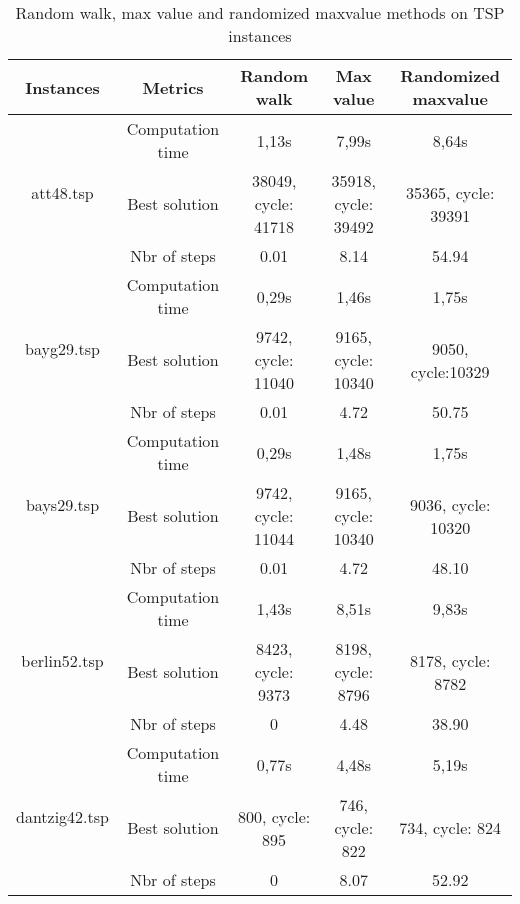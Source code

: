 
\begin{table}[htbp]
  \centering

	\renewcommand{\arraystretch}{1.5}
  \begin{tabular}{@{} |c|c|c|c|c| @{}}
	    \hline
    Instances & Metrics & Random walk & Max value & Randomized maxvalue \\ 
    \hline
    \multirow{3}{*}{att48.tsp} & Computation time & 1,13s & 7,99s & 8,64s \\ \cline{2-5}
    & Best solution & 38049, cycle: 41718 & 35918, cycle: 39492 & 35365, cycle: 39391 \\ \cline{2-5}
    & Nbr of steps & 0.01 & 8.14 & 54.94 \\ \cline{2-5}
    \hline
    \multirow{3}{*}{bayg29.tsp} & Computation time & 0,29s & 1,46s & 1,75s \\ \cline{2-5}
    & Best solution & 9742, cycle: 11040 & 9165, cycle: 10340 & 9050, cycle:10329 \\ \cline{2-5}
    & Nbr of steps & 0.01 & 4.72 & 50.75 \\ \cline{2-5}
    \hline
    \multirow{3}{*}{bays29.tsp} & Computation time & 0,29s & 1,48s & 1,75s \\ \cline{2-5}
    & Best solution & 9742, cycle: 11044 & 9165, cycle: 10340 & 9036, cycle: 10320 \\ \cline{2-5}
    & Nbr of steps & 0.01 & 4.72 & 48.10 \\ \cline{2-5}
   \hline
    \multirow{3}{*}{berlin52.tsp} & Computation time & 1,43s & 8,51s & 9,83s \\ \cline{2-5}
    & Best solution & 8423, cycle: 9373 & 8198, cycle: 8796 & 8178, cycle: 8782 \\ \cline{2-5}
    & Nbr of steps & 0 & 4.48 & 38.90 \\ \cline{2-5}
   \hline
    \multirow{3}{*}{dantzig42.tsp} & Computation time & 0,77s & 4,48s & 5,19s \\ \cline{2-5}
    & Best solution & 800, cycle: 895 & 746, cycle: 822 & 734, cycle: 824 \\ \cline{2-5}
    & Nbr of steps & 0 & 8.07 & 52.92\\ \cline{2-5}
    \hline
  \end{tabular}

  \caption{Random walk, max value and randomized maxvalue methods on TSP instances}
  \label{tps_comparison1}
\end{table}

\newpage

